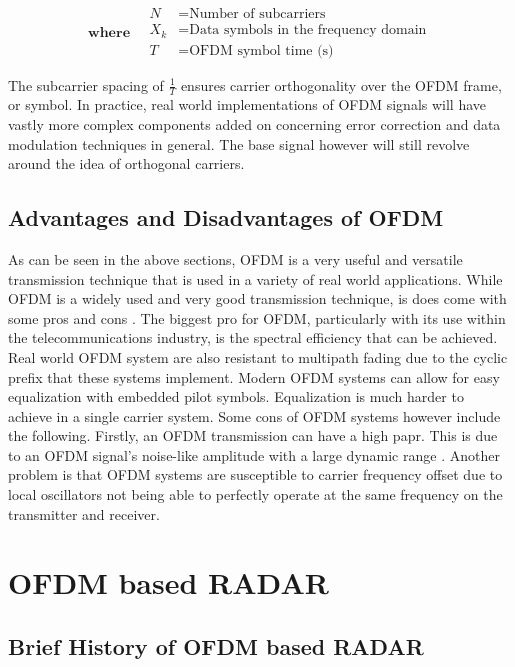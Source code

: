 \documentclass[11pt]{report}
\begin{document}
\[
\textbf{where} \quad
\begin{aligned}
N & = \text{Number of subcarriers} \\
X_k & = \text{Data symbols in the frequency domain} \\
T & = \text{OFDM symbol time (s)}
\end{aligned}
\]

The subcarrier spacing of \(\frac{1}{T}\) ensures carrier orthogonality over the OFDM frame, or symbol. In practice, real world implementations of OFDM signals will have vastly more complex components added on concerning error correction and data modulation techniques in general. The base signal however will still revolve around the idea of orthogonal carriers.

\subsection{Advantages and Disadvantages of OFDM}
As can be seen in the above sections, OFDM is a very useful and versatile transmission technique that is used in a variety of real world applications. While OFDM is a widely used and very good transmission technique, is does come with some pros and cons \cite{rfwirelessworld_ofdm_advantages_disadvantages}. The biggest pro for OFDM, particularly with its use within the telecommunications industry, is the spectral efficiency that can be achieved. Real world OFDM system are also resistant to multipath fading due to the cyclic prefix that these systems implement. Modern OFDM systems can allow for easy equalization with embedded pilot symbols. Equalization is much harder to achieve in a single carrier system. Some cons of OFDM systems however include the following. Firstly, an OFDM transmission can have a high \gls{papr}. This is due to an OFDM signal's noise-like amplitude with a large dynamic range \cite{rfwirelessworld_ofdm_advantages_disadvantages}. Another problem is that OFDM systems are susceptible to carrier frequency offset due to local oscillators not being able to perfectly operate at the same frequency on the transmitter and receiver. 



\section{OFDM based RADAR}
\subsection{Brief History of OFDM based RADAR}
\end{document}
